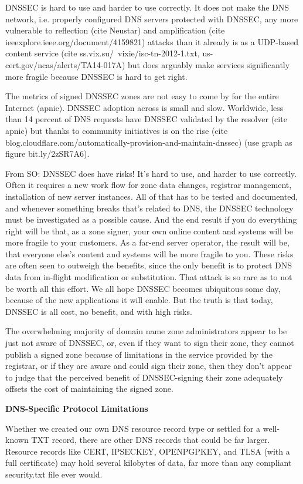 DNSSEC is hard to use and harder to use correctly. It does not make the DNS
network, i.e. properly configured DNS servers protected with DNSSEC, any more
vulnerable to reflection (cite Neustar) and amplification (cite
ieeexplore.ieee.org/document/4159821) attacks than it already is as a UDP-based
content service (cite ss.vix.su/~vixie/isc-tn-2012-1.txt,
us-cert.gov/ncas/alerts/TA14-017A) but does arguably make services significantly
more fragile because DNSSEC is hard to get right.

The metrics of signed DNSSEC zones are not easy to come by for the entire
Internet (apnic). DNSSEC adoption across is small and slow. Worldwide, less than
14 percent of DNS requests have DNSSEC validated by the resolver (cite apnic)
but thanks to community initiatives is on the rise (cite
blog.cloudflare.com/automatically-provision-and-maintain-dnssec) (use graph as
figure bit.ly/2zSR7A6).

From SO: DNSSEC does have risks! It's hard to use, and harder to use correctly.
Often it requires a new work flow for zone data changes, registrar management,
installation of new server instances. All of that has to be tested and
documented, and whenever something breaks that's related to DNS, the DNSSEC
technology must be investigated as a possible cause. And the end result if you
do everything right will be that, as a zone signer, your own online content and
systems will be more fragile to your customers. As a far-end server operator,
the result will be, that everyone else's content and systems will be more
fragile to you. These risks are often seen to outweigh the benefits, since the
only benefit is to protect DNS data from in-flight modification or substitution.
That attack is so rare as to not be worth all this effort. We all hope DNSSEC
becomes ubiquitous some day, because of the new applications it will enable. But
the truth is that today, DNSSEC is all cost, no benefit, and with high risks.

The overwhelming majority of domain name zone administrators appear to be just
not aware of DNSSEC, or, even if they want to sign their zone, they cannot
publish a signed zone because of limitations in the service provided by the
registrar, or if they are aware and could sign their zone, then they don’t
appear to judge that the perceived benefit of DNSSEC-signing their zone
adequately offsets the cost of maintaining the signed zone.

\textbf{DNS-Specific Protocol Limitations}

Whether we created our own DNS resource record type or settled for a well-known
TXT record, there are other DNS records that could be far larger. Resource
records like CERT, IPSECKEY, OPENPGPKEY, and TLSA (with a full certificate) may
hold several kilobytes of data, far more than any compliant security.txt file
ever would.

